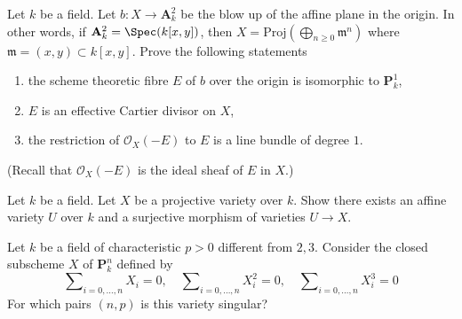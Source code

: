 \begin{exercise}
\label{exercise-normal-bundle-exceptional-curve}
Let $k$ be a field. Let $b : X \to \mathbf{A}^2_k$ be the blow
up of the affine plane in the origin. In other words, if
$\mathbf{A}^2_k = \Spec(k[x, y])$, then
$X = \text{Proj}(\bigoplus_{n \geq 0} \mathfrak m^n)$
where $\mathfrak m = (x, y) \subset k[x, y]$.
Prove the following statements
\begin{enumerate}
\item the scheme theoretic fibre $E$ of $b$ over the origin
is isomorphic to $\mathbf{P}^1_k$,
\item $E$ is an effective Cartier divisor on $X$,
\item the restriction of $\mathcal{O}_X(-E)$
to $E$ is a line bundle of degree $1$.
\end{enumerate}
(Recall that $\mathcal{O}_X(-E)$ is the ideal sheaf of $E$ in $X$.)
\end{exercise}

\begin{exercise}
\label{exercise-surjective-map-affine-variety-projective-variety}
Let $k$ be a field. Let $X$ be a projective variety over $k$.
Show there exists an affine variety $U$ over $k$ and a surjective
morphism of varieties $U \to X$.
\end{exercise}

\begin{exercise}
\label{exercise-vandermonde}
Let $k$ be a field of characteristic $p > 0$ different from $2,3$.
Consider the closed subscheme $X$ of $\mathbf{P}^n_k$ defined by
$$
\sum\nolimits_{i = 0, \ldots, n} X_i = 0,\quad
\sum\nolimits_{i = 0, \ldots, n} X_i^2 = 0,\quad
\sum\nolimits_{i = 0, \ldots, n} X_i^3 = 0
$$
For which pairs $(n, p)$ is this variety singular?
\end{exercise}





















